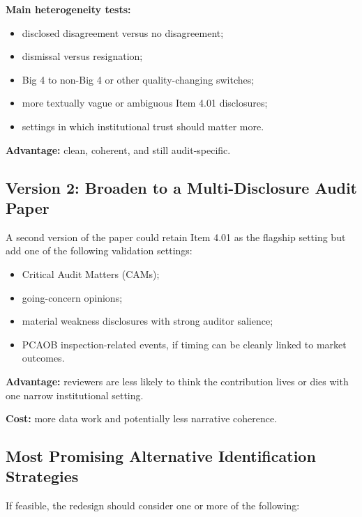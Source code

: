 \documentclass[12pt]{article}
\begin{document}
\textbf{Main heterogeneity tests:}
\begin{itemize}
    \item disclosed disagreement versus no disagreement;
    \item dismissal versus resignation;
    \item Big 4 to non-Big 4 or other quality-changing switches;
    \item more textually vague or ambiguous Item 4.01 disclosures;
    \item settings in which institutional trust should matter more.
\end{itemize}

\textbf{Advantage:} clean, coherent, and still audit-specific.

\subsection{Version 2: Broaden to a Multi-Disclosure Audit Paper}

A second version of the paper could retain Item 4.01 as the flagship setting but add one of the following validation settings:

\begin{itemize}
    \item Critical Audit Matters (CAMs);
    \item going-concern opinions;
    \item material weakness disclosures with strong auditor salience;
    \item PCAOB inspection-related events, if timing can be cleanly linked to market outcomes.
\end{itemize}

\textbf{Advantage:} reviewers are less likely to think the contribution lives or dies with one narrow institutional setting.

\textbf{Cost:} more data work and potentially less narrative coherence.

\subsection{Most Promising Alternative Identification Strategies}

If feasible, the redesign should consider one or more of the following:
\end{document}
